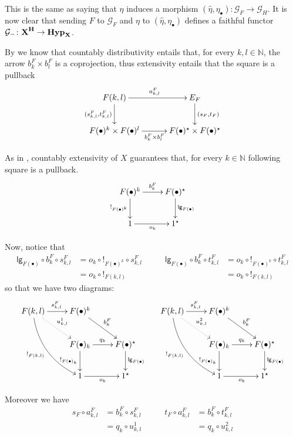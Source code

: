 \documentclass[runningheads,envcountsect]{llncs}
\newcommand{\lgh}{\mathsf{lg}}
\def\X{\textbf {\textup{X}}}
\newcommand{\catname}[1]{\textbf{\textup{#1}}}
\newcommand{\hyp}{\catname{Hyp}}
\begin{document}
This is the same as saying that $\eta$ induces a morphism $(\hat{\eta}, \eta_{\bullet})\colon \mathcal{G}_F\to \mathcal{G}_H$. It is now clear that sending $F$ to $\mathcal{G}_F$ and $\eta$ to $(\hat{\eta}, \eta_{\bullet})$ defines a faithful functor $\mathcal{G}_{-}\colon \catname{\X}^{\catname{H}}\to \hyp_\X$.

\begin{remark}\label{rem:utile}
	By  we know that countably distributivity entails that, for every $k,l\in \mathbb{N}$, the arrow $b^F_k\times b^F_l$ is a coprojection, thus extensivity entails that the square is a pullback 
	\[\xymatrix@C=30pt{F(k,l) \ar[d]_{(s^F_{k,l}, t^F_{k,l})}  \ar[r]^{a^F_{k,l}}& E_F \ar[d]^{(s_F, t_F)} \\ F(\bullet)^k\times F(\bullet)^l \ar[r]_{b^F_k\times b^F_l} & F(\bullet)^\star\times F(\bullet)^\star}\]
	
	
	\iffalse 
	As in , countably extensivity of $X$ guarantees that, for every $k\in \mathbb{N}$ following square is a pullback.	
	\[\xymatrix{F(\bullet)^k  \ar[r]^{b^F_k} \ar[d]_{!_{F(\bullet)^k}}& F(\bullet)^\star \ar[d]^{\lgh_{F(\bullet)}} \\ 1 \ar[r]_{o_k} & 1^\star}\]
	
	
	
	
	
	Now, notice that 
	\[\begin{split}
		\lgh_{F(\bullet)}\circ b^{F}_k\circ s^{F}_{k,l}&=o_{k}\circ !_{F(\bullet)^k}\circ s^F_{k,l}\\&=o_k\circ !_{F(k,l)}
	\end{split} \qquad \begin{split}
	\lgh_{F(\bullet)}\circ b^{F}_k\circ t^{F}_{k,l}&=o_{k}\circ !_{F(\bullet)^k}\circ t^F_{k,l}\\&=o_k\circ !_{F(k,l)}
	\end{split}\]
so that we have two diagrams:
	\[\xymatrix{F(k,l)\ar[r]^{s^F_{k,l}} \ar@{.>}[dr]^{u^1_{k,l}}  \ar@/_.5cm/[ddr]_{!_{F(k,l)}}&F(\bullet)^k \ar[dr]^{b^F_k}&& F(k,l) \ar@/_.5cm/[ddr]_{!_{F(k,l)}} \ar[r]^{s^F_{k,l}} \ar@{.>}[dr]^{u^2_{k,l}} &F(\bullet)^k \ar[dr]^{b^F_k}\\ & F(\bullet)_k  \ar[r]^{q_{k}} \ar[d]_{!_{F(\bullet)_k}}& F(\bullet)^\star \ar[d]^{\lgh_{F(\bullet)}} && F(\bullet)_k  \ar[r]^{q_{k} }\ar[d]_{!_{F(\bullet)_k}}& F(\bullet)^\star \ar[d]^{\lgh_{F(\bullet)}} \\ &  1 \ar[r]_{o_k} & 1^\star && 1 \ar[r]_{o_k} & 1^\star}\]
	
	Moreover we have
	\[\begin{split}
		s_F\circ a^F_{k,l}&=b^F_k\circ s^{F}_{k,l}\\&=
		q_{k}\circ u^1_{k,l}	\end{split} \qquad \begin{split}
		t_F\circ a^F_{k,l}&=b^F_k\circ t^{F}_{k,l}\\&=
		q_{k}\circ u^2_{k,l}	\end{split}  \]	
		

\end{remark}
\end{document}
